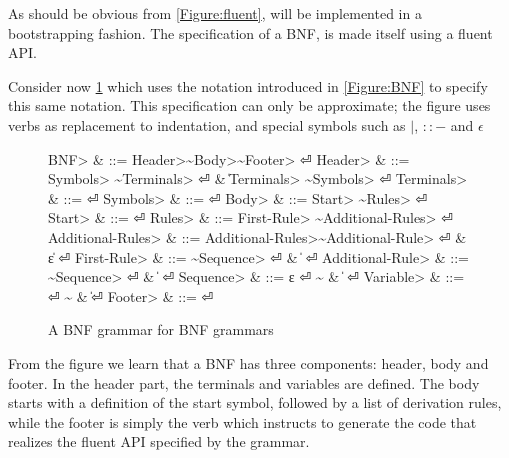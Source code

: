 As should be obvious from \cref{Figure:fluent}, \SELF will be implemented
  in a bootstrapping fashion.
The specification of a BNF, is made itself using a fluent API.

Consider now \cref{Figure:BNF:BNF}
  which uses the notation introduced in \cref{Figure:BNF}
  to specify this same notation.
This specification can only be approximate; 
  the figure uses verbs as replacement to indentation, 
  and special symbols such as $|$, $::-$ and $\epsilon$

\begin{figure}[H]
  \begin{Grammar}
    \begin{aligned}
      \<BNF>              & ::=              \<Header>\~           \<Body>\~                \<Footer>           \hfill⏎
      \<Header>           & ::=              \<Symbols>      \~      \<Terminals>           \hfill⏎
      {}                  & \|            \<Terminals> \~         \<Symbols>             \hfill⏎
      \<Terminals>        & ::=              \hfill⏎
      \<Symbols>          & ::=              \hfill⏎
      \<Body>             & ::=              \<Start>   \~           \<Rules>               \hfill⏎
      \<Start>            & ::=                \hfill⏎
      \<Rules>            & ::=              \<First-Rule> \~        \<Additional-Rules>    \hfill⏎
      \<Additional-Rules> & ::=              \<Additional-Rules>\~   \<Additional-Rule>     \hfill⏎
      {}                  & \|             ε                     \hfill⏎
      \<First-Rule>       & ::=              \~  \<Sequence>            \hfill⏎
      {}                  & \|                  \hfill⏎
      \<Additional-Rule>  & ::=              \~  \<Sequence>            \hfill⏎
      {}                  & \|                  \hfill⏎
      \<Sequence>         & ::=                 ε                     \hfill⏎
      {\~}                & \|   \hfill⏎
      \<Variable>         & ::=   \hfill⏎
      {\~}                & \|             \hfill⏎
      \<Footer>           & ::=  \hfill⏎
    \end{aligned}
  \end{Grammar}
  \caption{A BNF grammar for BNF grammars}
  \label{Figure:BNF:BNF}
\end{figure}

From the figure we learn that a BNF has three components: header, body and footer.
In the header part, the terminals and variables are defined.
The body starts with a definition of the start symbol, followed by a list of derivation 
  rules, while the footer is simply the verb  which instructs \SELF
  to generate the code that realizes the fluent API specified by the grammar.

